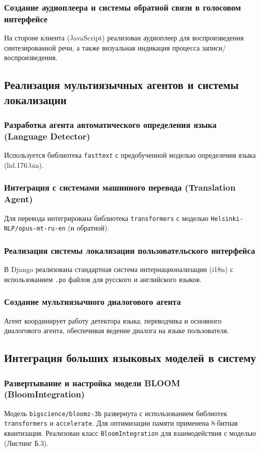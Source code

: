 \documentclass[a4paper,14pt]{extarticle}
\begin{document}
	\subsubsection{Создание аудиоплеера и системы обратной связи в голосовом интерфейсе}
	На стороне клиента (JavaScript) реализован аудиоплеер для воспроизведения синтезированной речи, а также визуальная индикация процесса записи/воспроизведения.
	
	\subsection{Реализация мультиязычных агентов и системы локализации}
	
	\subsubsection{Разработка агента автоматического определения языка (Language Detector)}
	Используется библиотека \texttt{fasttext} с предобученной моделью определения языка (lid.176.bin).
	
	\subsubsection{Интеграция с системами машинного перевода (Translation Agent)}
	Для перевода интегрирована библиотека \texttt{transformers} с моделью \texttt{Helsinki-NLP/opus-mt-ru-en} (и обратной).
	
	\subsubsection{Реализация системы локализации пользовательского интерфейса}
	В Django реализована стандартная система интернационализации (i18n) с использованием \texttt{.po} файлов для русского и английского языков.
	
	\subsubsection{Создание мультиязычного диалогового агента}
	Агент координирует работу детектора языка, переводчика и основного диалогового агента, обеспечивая ведение диалога на языке пользователя.
	
	\subsection{Интеграция больших языковых моделей в систему}
	
	\subsubsection{Развертывание и настройка модели BLOOM (BloomIntegration)}
	Модель \texttt{bigscience/bloomz-3b} развернута с использованием библиотек \texttt{transformers} и \texttt{accelerate}. Для оптимизации памяти применена 8-битная квантизация. Реализован класс \texttt{BloomIntegration} для взаимодействия с моделью (Листинг Б.3).
	
\end{document}
